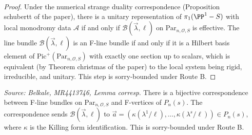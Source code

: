 \begin{proof}
  Under the numerical strange duality correspondence (Proposition schubertt of the paper), there is a unitary representation of \(\pi_1(\PP^1 - S)\) with local monodromy data \(\mathcal{A}\) if and only if \(\mathcal{B}(\vec{\lambda}, \ell)\) on \(\mathrm{Par}_{n,\mathcal{O},S}\) is effective. The line bundle \(\mathcal{B}(\vec{\lambda}, \ell)\) is an F-line bundle if and only if it is a Hilbert basis element of \(\mathrm{Pic}^+(\mathrm{Par}_{n,\mathcal{O},S})\) with exactly one section up to scalars, which is equivalent (by Theorem christmas of the paper) to the local system being rigid, irreducible, and unitary. This step is sorry-bounded under Route B.
\end{proof}

\begin{lemma}[FVertexFLineBundle]
  \label{lem:fvertex-flinebundle}
  \textit{Source: Belkale, MR4413746, Lemma corresp.}
  There is a bijective correspondence between F-line bundles on \(\mathrm{Par}_{n,\mathcal{O},S}\) and F-vertices of \(P_n(s)\). The correspondence sends \(\mathcal{B}(\vec{\lambda}, \ell)\) to \(\vec{a} = (\kappa(\lambda^1/\ell), \ldots, \kappa(\lambda^s/\ell)) \in P_n(s)\), where \(\kappa\) is the Killing form identification. This is sorry-bounded under Route B.
\end{lemma}

